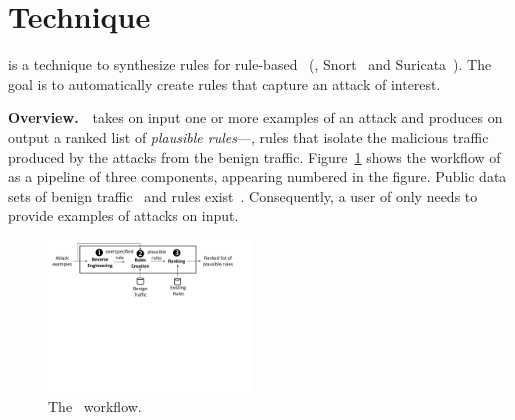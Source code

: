 \documentclass[conference]{IEEEtran}
\begin{document}
\section{Technique}
\label{sec:technique}

\tname{} is a technique to synthesize rules for rule-based
\nids~(\eg{}, Snort~\cite{snort} and Suricata~\cite{suricata}). The
goal is to automatically create rules that capture an attack of
interest.

\vspace{1ex}
\noindent\textbf{Overview.}~\tname\ takes on input one or more
examples of an attack and produces on output a ranked list of
\emph{plausible rules}---\ie{}, rules that isolate the malicious
traffic produced by the attacks from the benign
traffic. Figure~\ref{fig:overview} shows the workflow of \tname{} as a
pipeline of three components, appearing numbered in the figure.
Public data sets of benign
traffic~\cite{tcpreplay,stratosphere-normal} and rules
exist~\cite{emerging-threats-open}. Consequently, a user of \tname{}
only needs to provide examples of attacks on input.


\begin{figure}[t!]
  \centering
  \includegraphics[trim=0 340 50 0,clip,width=0.48\textwidth]{figs/nids-workflow}
  \caption{The \tname\ workflow.}
  \label{fig:overview}
  \vspace{-4ex}
\end{figure}
\end{document}
